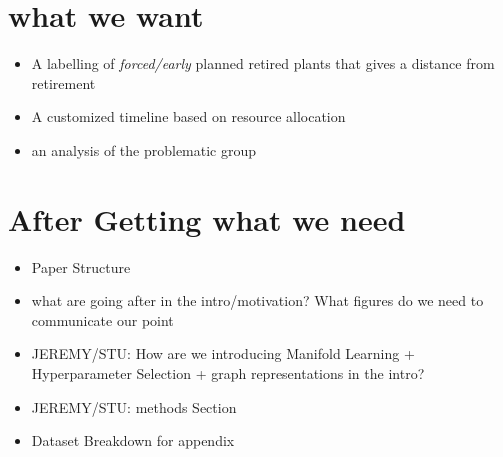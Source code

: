 \section{what we want}
\begin{itemize}
    \item A labelling of \textit{forced/early} planned retired plants that gives a distance from retirement  
    \item A customized timeline based on resource allocation 
    \item an analysis of the problematic group 
\end{itemize}


\section{After Getting what we need}

\begin{itemize}
    \item Paper Structure 
    \item what are going after in the intro/motivation? What figures do we need to communicate our point 
    \item JEREMY/STU: How are we introducing Manifold Learning + Hyperparameter Selection + graph representations in the intro?  
    \item JEREMY/STU: methods Section
    \item Dataset Breakdown for appendix
    
\end{itemize}


    
    
    
    
